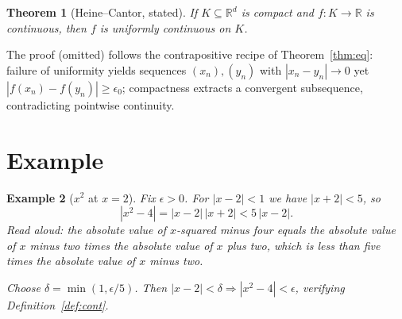 \documentclass[11pt]{article}
\newtheorem{theorem}{Theorem}
\newtheorem{example}[theorem]{Example}
\begin{document}
\begin{theorem}[Heine--Cantor, stated]
If $K \subseteq \mathbb{R}^d$ is compact and $f : K \to \mathbb{R}$ is
continuous, then $f$ is uniformly continuous on $K$.
\end{theorem}

The proof (omitted) follows the contrapositive recipe of
Theorem~\ref{thm:eq}: failure of uniformity yields sequences $(x_n), (y_n)$
with $|x_n - y_n| \to 0$ yet $|f(x_n) - f(y_n)| \geq \epsilon_0$; compactness
extracts a convergent subsequence, contradicting pointwise continuity.

\section{Example}

\begin{example}[$x^2$ at $x = 2$]
Fix $\epsilon > 0$. For $|x - 2| < 1$ we have $|x + 2| < 5$, so
\[
  |x^2 - 4| = |x - 2|\,|x + 2| < 5\,|x - 2|.
\]
\emph{Read aloud:} the absolute value of $x$-squared minus four equals the absolute value of $x$ minus two times the absolute value of $x$ plus two, which is less than five times the absolute value of $x$ minus two.

Choose $\delta = \min(1, \epsilon/5)$. Then
$|x - 2| < \delta \Rightarrow |x^2 - 4| < \epsilon$, verifying
Definition~\ref{def:cont}.
\end{example}
\end{document}
